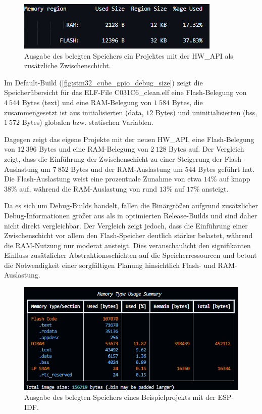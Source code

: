 \begin{figure}[H]
	\includegraphics[width=\textwidth]{Pics/stm32c031c6_gpio_debug_size_hw_api.png}
	\caption{Ausgabe des belegten Speichers ein Projektes mit der HW\_API als zusätzliche Zwischenschicht.}
	\label{fig:stm32_hw_api_gpio_debug_size}
\end{figure}

Im Default-Build (\cref{fig:stm32_cube_gpio_debug_size}) zeigt die Speicherübersicht für das ELF-File C031C6\_clean.elf eine Flash-Belegung von $4\ 544$ Bytes (text) und eine RAM-Belegung von $1\ 584$ Bytes, die zusammengesetzt ist aus initialisierten (data, $12$ Bytes) und uninitialisierten (bss, $1\ 572$ Bytes) globalen bzw. statischen Variablen.

Dagegen zeigt das eigene Projekte mit der neuen HW\_API, eine Flash-Belegung von $12\ 396$ Bytes und eine RAM-Belegung von $2\ 128$ Bytes auf. Der Vergleich zeigt, dass die Einführung der Zwischenschicht zu einer Steigerung der Flash-Auslastung um $7\ 852$ Bytes und der RAM-Auslastung um $544$ Bytes geführt hat. 
Die Flash-Auslastung weist eine prozentuale Zunahme von etwa $14$\% auf knapp $38$\% auf, während die RAM-Auslastung von rund $13$\% auf $17$\% ansteigt.

Da es sich um Debug-Builds handelt, fallen die Binärgrößen aufgrund zusätzlicher Debug-Informationen größer aus als in optimierten Release-Builds und sind daher nicht direkt vergleichbar. 
Der Vergleich zeigt jedoch, dass die Einführung einer Zwischenschicht vor allem den Flash-Speicher deutlich stärker belastet, während die RAM-Nutzung nur moderat ansteigt. 
Dies veranschaulicht den signifikanten Einfluss zusätzlicher Abstraktionsschichten auf die Speicherressourcen und betont die Notwendigkeit einer sorgfältigen Planung hinsichtlich Flash- und RAM-Auslastung.

\begin{figure}[H]
	\includegraphics[width=\textwidth]{Pics/esp32c6_sample_project_size.png}
	\caption{Ausgabe des belegten Speichers eines Beispielprojekts mit der ESP-IDF.}
	\label{fig:esp32_sample_size}
\end{figure}

